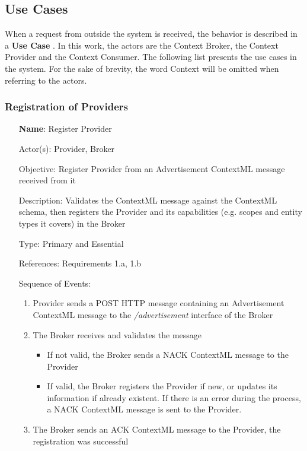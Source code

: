 \subsection{Use Cases}
When a request from outside the system is received, the behavior is described in a \textbf{Use Case} \cite{bittner2002use}. In this work, the actors are the Context Broker, the Context Provider and the Context Consumer. The following list presents the use cases in the system. For the sake of brevity, the word Context will be omitted when referring to the actors.

\subsubsection{Registration of Providers}
\begin{itemize}
	\item[\textbf{Name}:] Register Provider
	\item[Actor(s):] Provider, Broker
	\item[Objective:] Register Provider from an Advertisement ContextML message received from it
	\item[Description:] Validates the ContextML message against the ContextML schema, then registers the Provider and its capabilities (e.g. scopes and entity types it covers) in the Broker 
	\item[Type:] Primary and Essential
	\item[References:] Requirements 1.a, 1.b 
	\item[Sequence of Events:]\hfill
		\begin{enumerate}
			\item Provider sends a POST HTTP message containing an Advertisement ContextML message to the \textit{/advertisement} interface of the Broker
			\item The Broker receives and validates the message
				\begin{itemize}
					\item If not valid, the Broker sends a NACK ContextML message to the Provider
					\item If valid, the Broker registers the Provider if new, or updates its information if already existent. If there is an error during the process, a NACK ContextML message is sent to the Provider.
				\end{itemize}
			\item The Broker sends an ACK ContextML message to the Provider, the registration was successful
		\end{enumerate}
\end{itemize}

